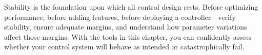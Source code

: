 Stability is the foundation upon which all control design rests. Before optimizing performance, before adding features, before deploying a controller---verify stability, ensure adequate margins, and understand how parameter variations affect those margins. With the tools in this chapter, you can confidently assess whether your control system will behave as intended or catastrophically fail.



